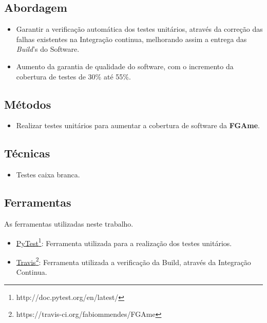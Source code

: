 \subsection{Abordagem}
\begin{itemize}
    \item Garantir a verificação automática dos testes unitários, através da correção das falhas existentes na Integração continua, melhorando assim a entrega das \textit{Build}'s do Software.  
    \item Aumento da garantia de qualidade do software, com o incremento da cobertura de testes de 30\% até 55\%.
\end{itemize}

\subsection{Métodos}
\begin{itemize}
    \item Realizar testes unitários para aumentar a cobertura de software da \textbf{FGAme}.
\end{itemize}

\subsection{Técnicas}
\begin{itemize}
    \item Testes caixa branca.
\end{itemize}

\subsection{Ferramentas}
As ferramentas utilizadas neste trabalho.
\begin{itemize}
    \item \href{http://doc.pytest.org/en/latest/}{PyTest}\footnote{http://doc.pytest.org/en/latest/}: Ferramenta utilizada para a realização dos testes unitários.
    \item \href{https://travis-ci.org/fabiommendes/FGAme}{Travis}\footnote{https://travis-ci.org/fabiommendes/FGAme}: Ferramenta utilizada a verificação da Build, através da Integração Continua.
\end{itemize}
